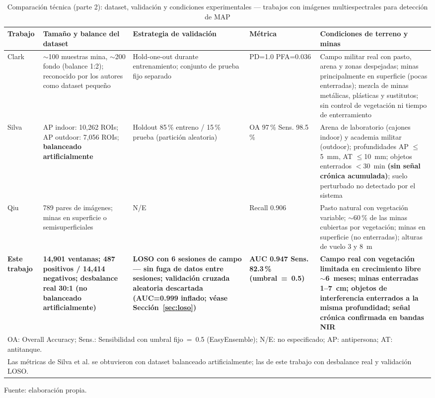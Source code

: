 \clearpage
\begin{landscape}
\begin{table}
\centering
\caption{Comparación técnica (parte 2): dataset, validación y condiciones experimentales ---
         trabajos con imágenes multiespectrales para detección de \ac{MAP}}
\label{tab:comparacion_ms_dataset}
\footnotesize
\begin{tabularx}{\linewidth}{p{1.8cm}X X p{2.0cm} X}
\toprule
\textbf{Trabajo} & \textbf{Tamaño y balance del dataset} &
\textbf{Estrategia de validación} & \textbf{Métrica} &
\textbf{Condiciones de terreno y minas} \\
\midrule
Clark \etal{} \cite{clark2000}
  & $\sim$100 muestras mina, $\sim$200 fondo (balance 1:2);
    reconocido por los autores como dataset pequeño
  & Hold-one-out durante entrenamiento; conjunto de prueba
    fijo separado
  & PD=1.0 PFA=0.036
  & Campo militar real con pasto, arena y zonas despejadas;
    minas principalmente en superficie (pocas enterradas);
    mezcla de minas metálicas, plásticas y sustitutos;
    sin control de vegetación ni tiempo de enterramiento \\
\addlinespace
Silva \etal{} \cite{silva2019}
  & AP indoor: 10,262 ROIs; AP outdoor: 7,056 ROIs;
    \textbf{balanceado artificialmente}
  & Holdout 85\,\% entreno / 15\,\% prueba (partición aleatoria)
  & OA 97\,\% Sens. 98.5\,\%
  & Arena de laboratorio (cajones indoor) y academia militar
    (outdoor); profundidades AP $\leq$5~mm, AT $\leq$10~mm;
    objetos enterrados $<$30~min \textbf{(sin señal crónica
    acumulada)}; suelo perturbado no detectado por el sistema \\
\addlinespace
Qiu \etal{} \cite{qiu2023}
  & 789 pares de imágenes;
    minas en superficie o semisuperficiales
  & N/E
  & Recall 0.906
  & Pasto natural con vegetación variable; $\sim$60\,\% de las
    minas cubiertas por vegetación; minas en superficie
    (no enterradas); alturas de vuelo 3 y 8~m \\
\addlinespace
\textbf{Este trabajo}
  & \textbf{14,901 ventanas; 487 positivos / 14,414 negativos;
    desbalance real 30:1 (no balanceado artificialmente)}
  & \textbf{LOSO con 6 sesiones de campo --- sin fuga de datos
    entre sesiones; validación cruzada aleatoria descartada
    (AUC=0.999 inflado; véase Sección~\ref{sec:loso})}
  & \textbf{AUC 0.947 Sens. 82.3\,\% (umbral~=~0.5)}
  & \textbf{Campo real con vegetación limitada en crecimiento
    libre $\sim$6~meses; minas enterradas 1--7~cm;
    objetos de interferencia enterrados a la misma profundidad;
    señal crónica confirmada en bandas NIR} \\
\bottomrule
\multicolumn{5}{l}{\small OA: Overall Accuracy; Sens.: Sensibilidad con umbral fijo~=~0.5 (EasyEnsemble);
N/E: no especificado; AP: antipersona; AT: antitanque.} \\
\multicolumn{5}{l}{\small Las métricas de Silva et al. se obtuvieron con dataset balanceado artificialmente;
las de este trabajo con desbalance real y validación LOSO.}
\end{tabularx}

  {\footnotesize Fuente: elaboración propia.}
\end{table}
\end{landscape}
